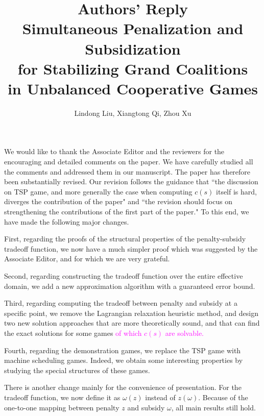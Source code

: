 \documentclass[11pt]{article}
\title{\textbf{Authors' Reply\\Simultaneous Penalization and Subsidization\\
for Stabilizing Grand Coalitions\\ in Unbalanced Cooperative Games}}
\author{Lindong Liu, Xiangtong Qi, Zhou Xu}
\date{}
\begin{document}
\maketitle
\noindent 
We would like to thank the Associate Editor and the reviewers for the encouraging and detailed comments on the paper. We have carefully studied all the comments and addressed them in our manuscript. The paper has therefore been substantially revised.
Our revision follows the   guidance that ``the discussion on TSP game, and more generally the case when computing $c(s)$ itself is hard, diverges the contribution of the paper" and ``the revision should focus on strengthening the contributions of the first part of the paper." To this end, we have made the following major changes.


First, regarding the proofs of the structural properties of the penalty-subsidy tradeoff function, we now have a much simpler proof which was suggested by the Associate Editor, and for which we are very grateful.

Second, regarding constructing the tradeoff function over the entire effective domain, we add a new approximation algorithm with a guaranteed error bound.


Third, regarding computing the tradeoff between penalty and subsidy at a specific point, we remove the Lagrangian relaxation heuristic method, and design two new solution approaches that are more theoretically sound, and that can find the exact solutions for some games \textcolor{magenta}{of which $c(s)$ are solvable.}


Fourth, regarding the demonstration games, we replace the TSP game with machine scheduling games. Indeed, we obtain some interesting properties by studying the special structures of these games.
 
There is another change mainly for the convenience of presentation. For the tradeoff function, we now define it as $\omega(z)$ instead of $z(\omega)$. Because of the one-to-one mapping between penalty $z$ and subsidy $\omega$, all main results still hold.
 
\end{document}
